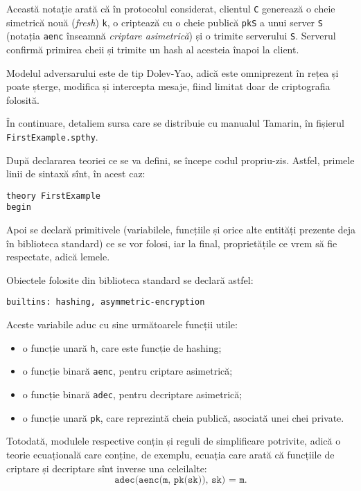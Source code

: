 Această notație arată că în protocolul considerat, clientul
\texttt{C} generează o cheie simetrică nouă (\emph{fresh}) \texttt{k},
o criptează cu o cheie publică \texttt{pkS} a unui server \texttt{S}
(notația \texttt{aenc} înseamnă \emph{criptare asimetrică}) și o
trimite serverului \texttt{S}. Serverul confirmă primirea cheii și
trimite un hash al acesteia înapoi la client.

Modelul adversarului este de tip Dolev-Yao, adică este omniprezent
în rețea și poate șterge, modifica și intercepta mesaje, fiind limitat
doar de criptografia folosită.

În continuare, detaliem sursa care se distribuie cu manualul Tamarin,
în fișierul \texttt{FirstExample.spthy}.

După declararea teoriei ce se va defini, se începe codul propriu-zis.
Astfel, primele linii de sintaxă sînt, în acest caz:

\begin{verbatim}
theory FirstExample
begin
\end{verbatim}

Apoi se declară primitivele (variabilele, funcțiile și orice alte entități
prezente deja în biblioteca standard) ce se vor folosi, iar la final,
proprietățile ce vrem să fie respectate, adică lemele.

Obiectele folosite din biblioteca standard se declară astfel:

\begin{verbatim}
builtins: hashing, asymmetric-encryption
\end{verbatim}

Aceste variabile aduc cu sine următoarele funcții utile:
\begin{itemize}
\item o funcție unară \texttt{h}, care este funcție de hashing;
\item o funcție binară \texttt{aenc}, pentru criptare asimetrică;
\item o funcție binară \texttt{adec}, pentru decriptare asimetrică;
\item o funcție unară \texttt{pk}, care reprezintă cheia publică, asociată
  unei chei private.
\end{itemize}

Totodată, modulele respective conțin și reguli de simplificare potrivite,
adică o teorie ecuațională care conține, de exemplu, ecuația care arată
că funcțiile de criptare și decriptare sînt inverse una celeilalte:
\[
  \texttt{adec(aenc(m, pk(sk)), sk) = m}.
\]

